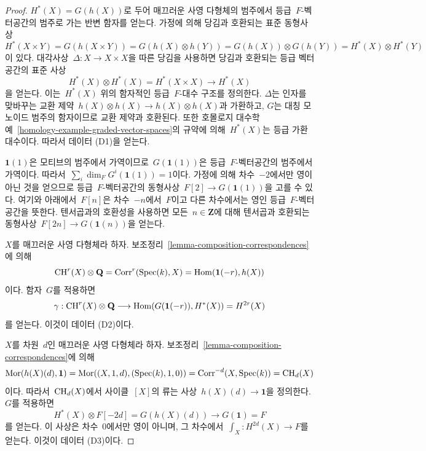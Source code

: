 \begin{proof}
$H^*(X) = G(h(X))$로 두어 매끄러운 사영 다형체의 범주에서 등급\ 
$F$-벡터공간의 범주로 가는 반변 함자를 얻는다. 가정에 의해 당김과
호환되는 표준 동형사상
$$
H^*(X \times Y) = G(h(X \times Y)) = G(h(X) \otimes h(Y)) =
G(h(X)) \otimes G(h(Y)) = H^*(X) \otimes H^*(Y)
$$
이 있다. 대각사상\  $\Delta : X \to X \times X$을 따른 당김을 사용하면
당김과 호환되는 등급 벡터공간의 표준 사상
$$
H^*(X) \otimes H^*(X) = H^*(X \times X) \to H^*(X)
$$
을 얻는다. 이는\  $H^*(X)$ 위의 함자적인 등급\  $F$-대수 구조를 정의한다.
$\Delta$는 인자를 맞바꾸는 교환 제약\ 
$h(X) \otimes h(X) \to h(X) \otimes h(X)$과 가환하고, $G$는 대칭
모노이드 범주의 함자이므로 교환 제약과 호환된다. 또한 호몰로지 대수학
예\  \ref{homology-example-graded-vector-spaces}의 규약에 의해\ 
$H^*(X)$는 등급 가환 대수이다. 따라서 데이터 (D1)을 얻는다.

\medskip\noindent
$\mathbf{1}(1)$은 모티브의 범주에서 가역이므로\ 
$G(\mathbf{1}(1))$은 등급\  $F$-벡터공간의 범주에서 가역이다.
따라서\  $\sum_i \dim_F G^i(\mathbf{1}(1)) = 1$이다. 가정에 의해
차수\  $-2$에서만 영이 아닌 것을 얻으므로 등급\  $F$-벡터공간의 동형사상\ 
$F[2] \to G(\mathbf{1}(1))$을 고를 수 있다. 여기와 아래에서\ 
$F[n]$은 차수\  $-n$에서\  $F$이고 다른 차수에서는 영인 등급\ 
$F$-벡터공간을 뜻한다. 텐서곱과의 호환성을 사용하면 모든\ 
$n \in \mathbf{Z}$에 대해 텐서곱과 호환되는 동형사상\ 
$F[2n] \to G(\mathbf{1}(n))$을 얻는다.

\medskip\noindent
$X$를 매끄러운 사영 다형체라 하자. 보조정리\ 
\ref{lemma-composition-correspondences}에 의해
$$
\mathop{\mathrm{CH}}\nolimits^r(X) \otimes \mathbf{Q} = \text{Corr}^r(\mathop{\mathrm{Spec}}(k), X) =
\mathop{\mathrm{Hom}}\nolimits(\mathbf{1}(-r), h(X))
$$
이다. 함자\  $G$를 적용하면
$$
\gamma :
\mathop{\mathrm{CH}}\nolimits^r(X) \otimes \mathbf{Q} \longrightarrow
\mathop{\mathrm{Hom}}\nolimits(G(\mathbf{1}(-r)), H^*(X)) = H^{2r}(X)
$$
를 얻는다. 이것이 데이터 (D2)이다.

\medskip\noindent
$X$를 차원\  $d$인 매끄러운 사영 다형체라 하자. 보조정리\ 
\ref{lemma-composition-correspondences}에 의해
$$
\mathop{\mathrm{Mor}}\nolimits(h(X)(d), \mathbf{1}) = \mathop{\mathrm{Mor}}\nolimits((X, 1, d), (\mathop{\mathrm{Spec}}(k), 1, 0)) =
\text{Corr}^{-d}(X, \mathop{\mathrm{Spec}}(k)) = \mathop{\mathrm{CH}}\nolimits_d(X)
$$
이다. 따라서\  $\mathop{\mathrm{CH}}\nolimits_d(X)$에서 사이클\  $[X]$의 류는 사상\ 
$h(X)(d) \to \mathbf{1}$을 정의한다. $G$를 적용하면
$$
H^*(X) \otimes F[-2d] = G(h(X)(d)) \longrightarrow G(\mathbf{1}) = F
$$
를 얻는다. 이 사상은 차수\  $0$에서만 영이 아니며, 그 차수에서\ 
$\int_X : H^{2d}(X) \to F$를 얻는다. 이것이 데이터 (D3)이다.


\end{proof}
